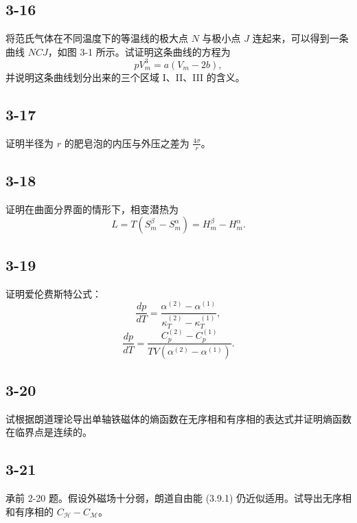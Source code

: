 \newpage
\subsection{3-16}
将范氏气体在不同温度下的等温线的极大点 $N$ 与极小点 $J$ 连起来，可以得到一条曲线 $NCJ$，如图 3-1 所示。试证明这条曲线的方程为
$$ pV_m^3 = a(V_m - 2b), $$
并说明这条曲线划分出来的三个区域 I、II、III 的含义。

\newpage
\subsection{3-17}
证明半径为 $r$ 的肥皂泡的内压与外压之差为 $\frac{4\sigma}{r}$。

\newpage
\subsection{3-18}
证明在曲面分界面的情形下，相变潜热为
$$ L = T(S_m^\beta - S_m^\alpha) = H_m^\beta - H_m^\alpha. $$

\newpage
\subsection{3-19}
证明爱伦费斯特公式：
$$ \frac{dp}{dT} = \frac{\alpha^{(2)} - \alpha^{(1)}}{\kappa_T^{(2)} - \kappa_T^{(1)}}, $$
$$ \frac{dp}{dT} = \frac{C_p^{(2)} - C_p^{(1)}}{TV(\alpha^{(2)} - \alpha^{(1)})}. $$

\newpage
\subsection{3-20}
试根据朗道理论导出单轴铁磁体的熵函数在无序相和有序相的表达式并证明熵函数在临界点是连续的。

\newpage
\subsection{3-21}
承前 2-20 题。假设外磁场十分弱，朗道自由能 (3.9.1) 仍近似适用。试导出无序相和有序相的 $C_{\mathscr{H}} - C_{\mathscr{M}}$。